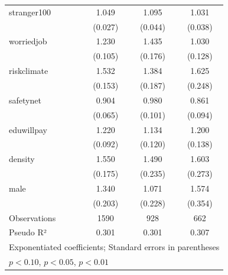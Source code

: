 \begin{table}[htbp]
\begin{tabular}{l*{3}{c}}
\addlinespace
stranger100 &       1.049\sym{*}  &       1.095\sym{**} &       1.031         \\
            &     (0.027)         &     (0.044)         &     (0.038)         \\
\addlinespace
worriedjob  &       1.230\sym{**} &       1.435\sym{***}&       1.030         \\
            &     (0.105)         &     (0.176)         &     (0.128)         \\
\addlinespace
riskclimate &       1.532\sym{***}&       1.384\sym{**} &       1.625\sym{***}\\
            &     (0.153)         &     (0.187)         &     (0.248)         \\
\addlinespace
safetynet   &       0.904         &       0.980         &       0.861         \\
            &     (0.065)         &     (0.101)         &     (0.094)         \\
\addlinespace
eduwillpay  &       1.220\sym{***}&       1.134         &       1.200         \\
            &     (0.092)         &     (0.120)         &     (0.138)         \\
\addlinespace
density     &       1.550\sym{***}&       1.490\sym{**} &       1.603\sym{***}\\
            &     (0.175)         &     (0.235)         &     (0.273)         \\
\addlinespace
male        &       1.340\sym{*}  &       1.071         &       1.574\sym{**} \\
            &     (0.203)         &     (0.228)         &     (0.354)         \\
\midrule
Observations&        1590         &         928         &         662         \\
Pseudo R²  &       0.301         &       0.301         &       0.307         \\
\bottomrule
\multicolumn{4}{l}{\footnotesize Exponentiated coefficients; Standard errors in parentheses}\\
\multicolumn{4}{l}{\footnotesize \sym{*} \(p<0.10\), \sym{**} \(p<0.05\), \sym{***} \(p<0.01\)}\\
\end{tabular}
\end{table}
